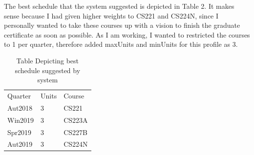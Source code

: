 \documentclass[12pt]{article}
\begin{document}
\begin{enumerate}[label=(\alph*)]
The best schedule that the system suggested is depicted in Table 2. It makes sense because I had given higher weights to CS221 and CS224N, since I personally wanted to take these courses up with a vision to finish the graduate certificate as soon as possible. As I am working, I wanted to restricted the courses to 1 per quarter, therefore added maxUnits and minUnits for this profile as 3.
\begin{table}
\centering
\caption{Table Depicting best schedule suggested by system}
\begin{tabular}{lll}
Quarter & Units & Course  \\
Aut2018 & 3     & CS221   \\
Win2019 & 3     & CS223A  \\
Spr2019 & 3     & CS227B  \\
Aut2019 & 3     & CS224N 
\end{tabular}
\end{table}
\end{enumerate}
\end{document}
